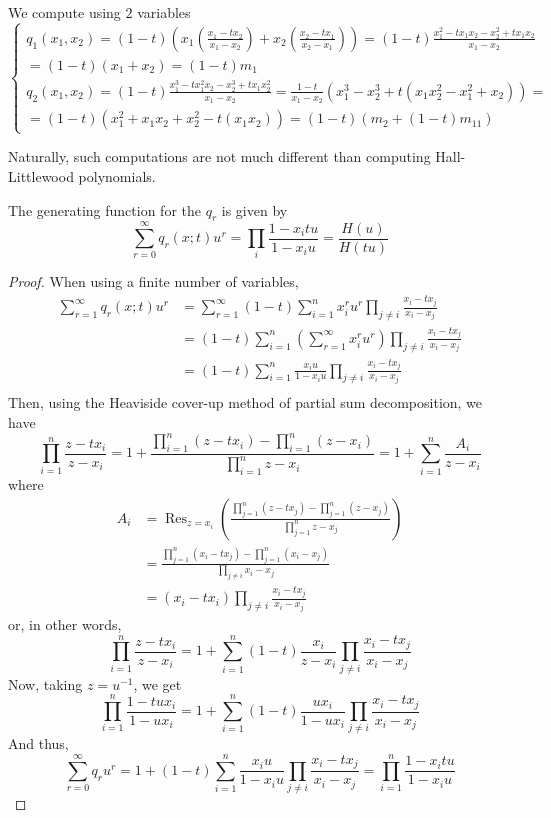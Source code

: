 \documentclass[11pt,leqno,oneside]{amsart}
\numberwithin{thm}{section}
\begin{document}
\begin{example}
  We compute using \(2\) variables \[
    \begin{cases}
      q_1(x_1,x_2) = (1-t) \left(x_1\left( \frac{x_1-tx_2}{x_1-x_2}
        \right)+x_2\left( \frac{x_2-tx_1}{x_2-x_1} \right)\right) =
      (1-t) \frac{x_1^2-tx_1x_2-x_2^2+tx_1x_2}{x_1-x_2} \\ =
      (1-t)(x_1+x_2) = (1-t)m_1 \\
      q_2(x_1,x_2) =
      (1-t)\frac{x_1^3-tx_1^2x_2-x_2^3+tx_1x_2^2}{x_1-x_2} =
      \frac{1-t}{x_1-x_2}(x_1^3-x_2^3 + t(x_1 x_2^2 - x_1^2+x_2)) = \\
      = (1-t)(x_1^2+x_1 x_2 + x_2^2 - t(x_1 x_2)) = (1-t)(m_2+(1-t)m_{11})
    \end{cases}
  \]
\end{example}
Naturally, such computations are not much different than computing
Hall-Littlewood polynomials.
\begin{prop}
  The generating function for the \(q_r\) is given by \[
    \sum_{r=0}^\infty q_r(x;t) u^r = \prod_i \frac{1-x_i t u}{1 - x_i
      u} = \frac{H(u)}{H(tu)}
  \]
\end{prop}
\begin{proof}
  When using a finite number of variables,
  \begin{align*}
    \sum_{r=1}^\infty q_r(x;t) u^r
    & = \sum_{r=1}^\infty (1-t) \sum_{i=1}^n x_i^r u^r \prod_{j \neq i}
      \frac{x_i-tx_j}{x_i-x_j}  \\
    & = (1-t)  \sum_{i=1}^n \left(\sum_{r=1}^\infty x_i^r u^r\right)
      \prod_{j \neq i} \frac{x_i-tx_j}{x_i-x_j} \\
    & = (1-t) \sum_{i=1}^n \frac{x_i u}{1-x_i u} \prod_{j \neq i}
      \frac{x_i-tx_j}{x_i-x_j} \\
  \end{align*}
  Then, using the Heaviside cover-up method of partial sum
  decomposition, we have \[ 
    \prod_{i=1}^n \frac{z- t x_i}{z - x_i} = 1 + \frac{\prod_{i=1}^n (z
    - t x_i)-\prod_{i=1}^n (z - x_i)}{\prod_{i=1}^n z-x_i} = 1 + \sum_{i=1}^n \frac{A_i}{z-x_i}
  \]
  where
  \begin{align*}
    A_i & = \operatorname{Res}_{z=x_i}\left(  \frac{ \prod_{j=1}^n (z- t
        x_j) - \prod_{j=1}^n (z-x_j)}{\prod_{j=1}^n z - x_j} \right)
    \\
    & = \frac{\prod_{j=1}^n (x_i-t
      x_j) - \prod_{j=1}^n (x_i - x_j)}{\prod_{j \neq i} x_i-x_j} \\
    & = (x_i-tx_i) \prod_{j \neq i}\frac{x_i-t
    x_j}{ x_i - x_j}
  \end{align*}
  or, in other words, \[
    \prod_{i=1}^n \frac{z- t x_i}{z - x_i} = 1+\sum_{i=1}^n
    (1-t)\frac{x_i}{z-x_i} \prod_{j \neq i}\frac{x_i-t
    x_j}{ x_i - x_j}
  \]
  Now, taking \(z = u^{-1}\), we get \[
    \prod_{i=1}^n \frac{1-t u x_i}{1 - u x_i} = 1+\sum_{i=1}^n
    (1-t)\frac{u x_i}{1- u x_i} \prod_{j \neq i}\frac{x_i-t
    x_j}{ x_i - x_j}
  \]
  And thus, \[
    \sum_{r=0}^\infty q_r u^r = 1 + (1-t) \sum_{i=1}^n \frac{x_i u}{1-x_i u} \prod_{j \neq i}
      \frac{x_i-tx_j}{x_i-x_j} = \prod_{i=1}^n \frac{1-x_i t u}{1-x_i u}
  \]
\end{proof}
\end{document}
